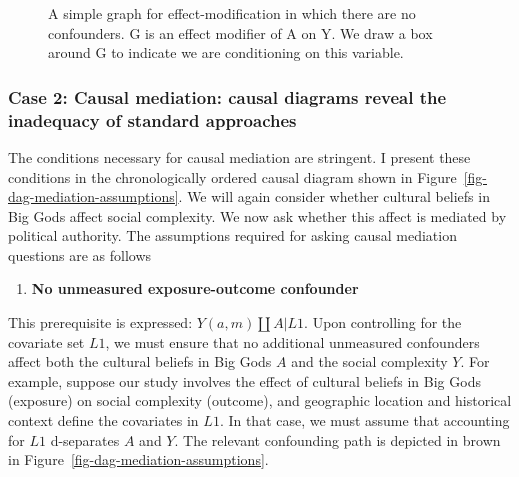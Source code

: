\documentclass[
  singlecolumn,
  9pt]{article}
\providecommand{\tightlist}{%
  \setlength{\itemsep}{0pt}\setlength{\parskip}{0pt}}\usepackage{longtable,booktabs,array}
\begin{document}
\begin{figure}


\caption{\label{fig-dag-effect-modfication}A simple graph for
effect-modification in which there are no confounders. G is an effect
modifier of A on Y. We draw a box around G to indicate we are
conditioning on this variable.}

\end{figure}%

\subsubsection{Case 2: Causal mediation: causal diagrams reveal the
inadequacy of standard
approaches}\label{case-2-causal-mediation-causal-diagrams-reveal-the-inadequacy-of-standard-approaches}

The conditions necessary for causal mediation are stringent. I present
these conditions in the chronologically ordered causal diagram shown in
Figure~\ref{fig-dag-mediation-assumptions}. We will again consider
whether cultural beliefs in Big Gods affect social complexity. We now
ask whether this affect is mediated by political authority. The
assumptions required for asking causal mediation questions are as
follows

\begin{enumerate}
\def\labelenumi{\arabic{enumi}.}
\tightlist
\item
  \textbf{No unmeasured exposure-outcome confounder}
\end{enumerate}

This prerequisite is expressed: \(Y(a,m) \coprod A | L1\). Upon
controlling for the covariate set \(L1\), we must ensure that no
additional unmeasured confounders affect both the cultural beliefs in
Big Gods \(A\) and the social complexity \(Y\). For example, suppose our
study involves the effect of cultural beliefs in Big Gods (exposure) on
social complexity (outcome), and geographic location and historical
context define the covariates in \(L1\). In that case, we must assume
that accounting for \(L1\) d-separates \(A\) and \(Y\). The relevant
confounding path is depicted in brown in
Figure~\ref{fig-dag-mediation-assumptions}.
\end{document}
